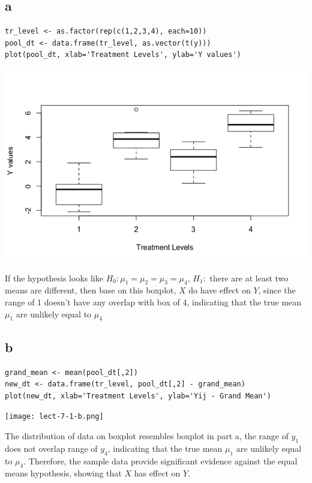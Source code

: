\documentclass[11pt,letterpaper]{article}
\begin{document}
\subsection*{a}
\begin{verbatim}
tr_level <- as.factor(rep(c(1,2,3,4), each=10))
pool_dt <- data.frame(tr_level, as.vector(t(y)))
plot(pool_dt, xlab='Treatment Levels', ylab='Y values')
\end{verbatim}
\includegraphics[scale=0.45]{lect-7-1-a.png}

\noindent If the hypothesis looks like $H_0: \mu_1 = \mu_2 = \mu_3 = \mu_4$, $H_1:$ there are at least two means are different, then base on this boxplot, $X$ do have effect on $Y$, since the range of 1 doesn't have any overlap with box of 4, indicating that the true mean $\mu_1$ are unlikely equal to $\mu_4$  \\

\subsection*{b}
\begin{verbatim}
grand_mean <- mean(pool_dt[,2])
new_dt <- data.frame(tr_level, pool_dt[,2] - grand_mean)
plot(new_dt, xlab='Treatment Levels', ylab='Yij - Grand Mean')
\end{verbatim}
\texttt{[image: lect-7-1-b.png]}

\noindent  The distribution of data on boxplot resembles boxplot in part a, the range of $y_1$ does not overlap range of $y_4$, indicating that the true mean $\mu_1$ are unlikely equal to $\mu_4$. Therefore, the sample data provide significant evidence against the equal means hypothesis, showing that $X$ has effect on $Y$.\\
\end{document}
